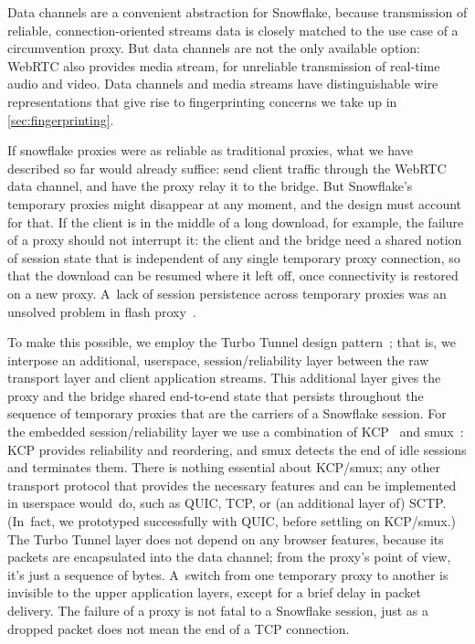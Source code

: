 \documentclass[letterpaper,twocolumn]{article}
\begin{document}
Data channels are a convenient abstraction for Snowflake,
because transmission of reliable,
connection-oriented streams data is closely matched
to the use case of a circumvention proxy.
But data channels are not the only available option:
WebRTC also provides media stream,
for unreliable transmission of real-time audio and video.
Data channels and media streams have distinguishable wire representations
that give rise to fingerprinting concerns we take up in \autoref{sec:fingerprinting}.

If snowflake proxies were as reliable as traditional proxies,
what we have described so far would already suffice:
send client traffic through the WebRTC data channel,
and have the proxy relay it to the bridge.
But Snowflake's temporary proxies might
disappear at any moment,
and the design must account for that.
If the client is in the middle of a long download,
for example, the failure of a proxy should not interrupt it:
the client and the bridge need a shared notion of session state
that is independent of any single temporary proxy connection,
so that the download can be resumed where it left off,
once connectivity is restored on a new proxy.
A~lack of session persistence across temporary proxies
was an unsolved problem in flash proxy~\cite[\S 5.2]{Fifield2012a}.

To make this possible, we employ the
Turbo Tunnel design pattern~\cite{Fifield2020a};
that is, we interpose an additional, userspace,
session/reliability layer between the raw transport layer
and client application streams.
This additional layer gives the proxy and the bridge
shared end-to-end state that persists throughout
the sequence of temporary proxies that are the carriers of a Snowflake session.
For the embedded session/reliability layer
we use a combination of
KCP~\cite{kcp} and
smux~\cite{smux}:
KCP provides reliability and reordering,
and smux detects the end of idle sessions and terminates them.
There is nothing essential about KCP/smux;
any other transport protocol that provides the necessary features
and can be implemented in userspace would~do,
such as QUIC, TCP, or (an additional layer of) SCTP.
(In~fact, we prototyped successfully with QUIC, before settling on KCP/smux.)
The Turbo Tunnel layer does not depend on any browser features,
because its packets are encapsulated into the data channel;
from the proxy's point of view, it's just a sequence of bytes.
A~switch from one temporary proxy to another
is invisible to the upper application layers,
except for a brief delay in packet delivery.
The failure of a proxy
is not fatal to a Snowflake session,
just as a dropped packet does not mean the end of a TCP connection.
\end{document}
